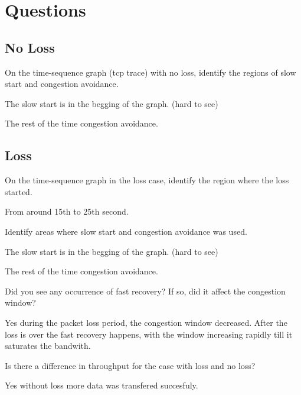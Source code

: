\documentclass{article}
\begin{document}
\clearpage
\section*{Questions}
\subsection*{No Loss}
\noindent
On the time-sequence graph (tcp trace) with no loss, identify the regions of slow start and congestion avoidance.

The slow start is in the begging of the graph. (hard to see)

The rest of the time congestion avoidance.

\subsection*{Loss}
\noindent
On the time-sequence graph in the loss case, identify the region where the loss started.

From around 15th to 25th second.

\noindent
Identify areas where slow start and congestion avoidance was used.

The slow start is in the begging of the graph. (hard to see)

The rest of the time congestion avoidance.

\noindent
Did you see any occurrence of fast recovery? If so, did it affect the congestion window?

Yes during the packet loss period, the congestion window decreased. After the loss is over the fast recovery happens, with the window increasing rapidly till it saturates the bandwith.

\noindent
Is there a difference in throughput for the case with loss and no loss?

Yes without loss more data was transfered succesfuly.
\end{document}
